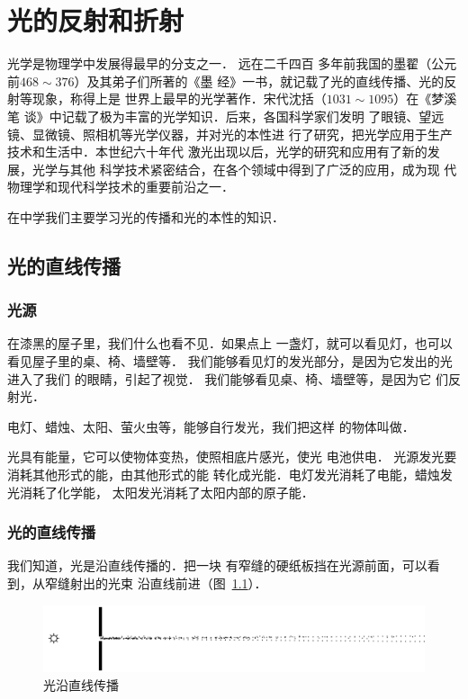 \chapter{光的反射和折射}\label{chapter-reflection-and-refraction-of-light}

光学是物理学中发展得最早的分支之一．
远在二千四百
多年前我国的墨翟（公元前$468 \sim 376$）及其弟子们所著的《墨
经》一书，就记载了光的直线传播、光的反射等现象，称得上是
世界上最早的光学著作．宋代沈括（$1031 \sim 1095$）在《梦溪笔
谈》中记载了极为丰富的光学知识．后来，各国科学家们发明
了眼镜、望远镜、显微镜、照相机等光学仪器，并对光的本性进
行了研究，把光学应用于生产技术和生活中．本世纪六十年代
激光出现以后，光学的研究和应用有了新的发展，光学与其他
科学技术紧密结合，在各个领域中得到了广泛的应用，成为现
代物理学和现代科学技术的重要前沿之一．

在中学我们主要学习光的传播和光的本性的知识．

\section{光的直线传播}
\subsection{光源}

在漆黑的屋子里，我们什么也看不见．如果点上
一盏灯，就可以看见灯，也可以看见屋子里的桌、椅、墙壁等．
我们能够看见灯的发光部分，是因为它发出的光进入了我们
的眼睛，引起了视觉．
我们能够看见桌、椅、墙壁等，是因为它
们反射光．

电灯、蜡烛、太阳、萤火虫等，能够自行发光，我们把这样
的物体叫做．

光具有能量，它可以使物体变热，使照相底片感光，使光
电池供电．
光源发光要消耗其他形式的能，由其他形式的能
转化成光能．电灯发光消耗了电能，蜡烛发光消耗了化学能，
太阳发光消耗了太阳内部的原子能．

\subsection{光的直线传播}

我们知道，光是沿直线传播的．把一块
有窄缝的硬纸板挡在光源前面，可以看到，从窄缝射出的光束
沿直线前进（图~\ref{fig_C_5-1}）．
\begin{figure}[htbp]
    \centering
    \includegraphics{fig/C/5-1.pdf}
    \caption{光沿直线传播}\label{fig_C_5-1}
\end{figure}

